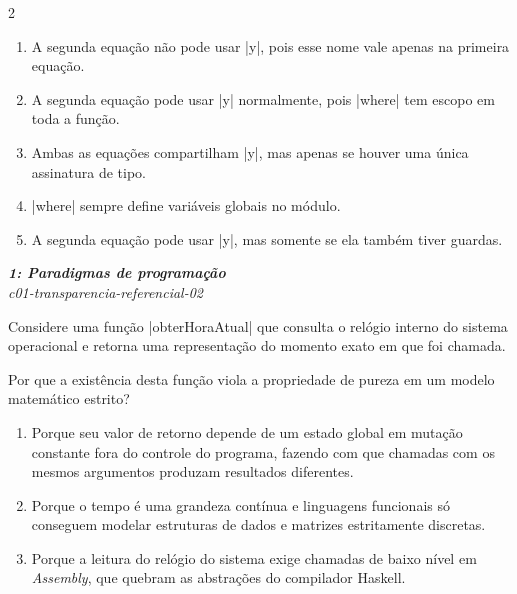 \documentclass[a4paper,10pt,brazil]{article}
\begin{document}
\begin{multicols}{2}
\begin{enumerate}
  \item A segunda equação não pode usar \haskellinline|y|, pois esse nome vale apenas na primeira equação.

  \item A segunda equação pode usar \haskellinline|y| normalmente, pois \haskellinline|where| tem escopo em toda a função.

  \item Ambas as equações compartilham \haskellinline|y|, mas apenas se houver uma única assinatura de tipo.

  \item \haskellinline|where| sempre define variáveis globais no módulo.

  \item A segunda equação pode usar \haskellinline|y|, mas somente se ela também tiver guardas.


\end{enumerate}

\begin{flushright}
  \footnotesize
  \textit{\textbf{1: Paradigmas de programação}}\\
  \textit{c01-transparencia-referencial-02}\\

\end{flushright}
Considere uma função \haskellinline|obterHoraAtual| que consulta o relógio interno do sistema operacional e retorna uma representação do momento exato em que foi chamada.

Por que a existência desta função viola a propriedade de pureza em um modelo matemático estrito?

\begin{enumerate}
  \item Porque seu valor de retorno depende de um estado global em mutação constante fora do controle do programa, fazendo com que chamadas com os mesmos argumentos produzam resultados diferentes.

  \item Porque o tempo é uma grandeza contínua e linguagens funcionais só conseguem modelar estruturas de dados e matrizes estritamente discretas.

  \item Porque a leitura do relógio do sistema exige chamadas de baixo nível em \emph{Assembly}, que quebram as abstrações do compilador Haskell.


\end{enumerate}
\end{multicols}
\end{document}
